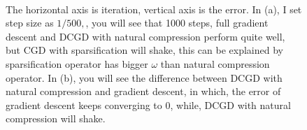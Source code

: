 \documentclass[12pt,a4paper]{article}
\begin{document}
	\begin{figure}
		\centering
		\\ %
		
		
		\caption{  The horizontal axis is iteration, vertical axis is the error. In (a), I set step  size as $1/500,$, you will see that 1000 steps, full gradient descent and DCGD with natural compression perform quite well, but CGD with sparsification will shake, this can be explained by sparsification operator has bigger $\omega$ than natural compression operator. In (b), you will see the difference between DCGD with natural compression and gradient descent, in which, the error of gradient descent keeps converging to 0, while, DCGD with natural compression will shake.} %
		\label{img1}
	\end{figure}
	
	
	
\end{document}
